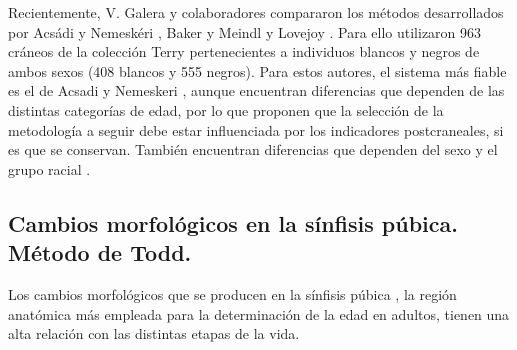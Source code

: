 \documentclass[a4paper,11pt]{article}
\begin{document}
\begin{center}
\end{center}

Recientemente, V. Galera y colaboradores compararon los métodos desarrollados por Acsádi y Nemeskéri \cite{acsadi1970history}, Baker \cite{baker1984relationship} y Meindl y Lovejoy \cite{meindl1985ectocranial}. Para ello utilizaron 963 cráneos de la colección Terry pertenecientes a individuos blancos y negros de ambos sexos (408 blancos y 555 negros).
Para estos autores, el sistema más fiable es el de Acsadi y Nemeskeri , aunque encuentran diferencias que dependen de las distintas categorías de edad, por lo que proponen que la selección de la metodología a seguir debe estar influenciada por los indicadores postcraneales, si es que se conservan. También encuentran diferencias que dependen del sexo y el grupo racial \cite{galera1998comparison}.
\subsection{Cambios morfológicos en la sínfisis púbica. Método de Todd.}
Los cambios morfológicos que se producen en la sínfisis púbica , la región anatómica más empleada para la determinación de la edad en adultos, tienen una alta relación con las distintas etapas de la vida.
\end{document}
